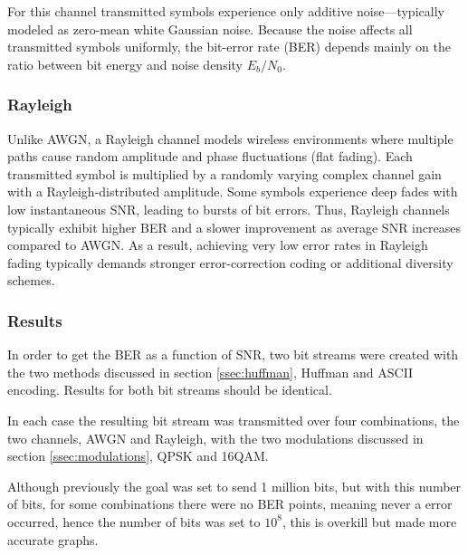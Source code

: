 For this channel transmitted symbols experience only additive noise—typically modeled as zero-mean white Gaussian noise. Because the noise affects all transmitted symbols uniformly, the bit-error rate (BER) depends mainly on the ratio between bit energy and noise density $E_b/N_{0}$. 

\subsubsection{Rayleigh}

Unlike AWGN, a Rayleigh channel models wireless environments where multiple paths cause random amplitude and phase fluctuations (flat fading). Each transmitted symbol is multiplied by a randomly varying complex channel gain with a Rayleigh-distributed amplitude. Some symbols experience deep fades with low instantaneous SNR, leading to bursts of bit errors. Thus, Rayleigh channels typically exhibit higher BER and a slower improvement as average SNR increases compared to AWGN. As a result, achieving very low error rates in Rayleigh fading typically demands stronger error-correction coding or additional diversity schemes.

\subsubsection{Results}
\label{sec:channel_results}

In order to get the BER as a function of SNR, two bit streams were created with the two methods discussed in section \ref{ssec:huffman}, Huffman and ASCII encoding. Results for both bit streams should be identical. 

In each case the resulting bit stream was transmitted over four combinations, the two channels, AWGN and Rayleigh, with the two modulations discussed in section \ref{ssec:modulations}, QPSK and 16QAM.

Although previously the goal was set to send 1 million bits, but with this number of bits, for some combinations there were no BER points, meaning never a error occurred, hence the number of bits was set to $10^{8}$, this is overkill but made more accurate graphs. 


